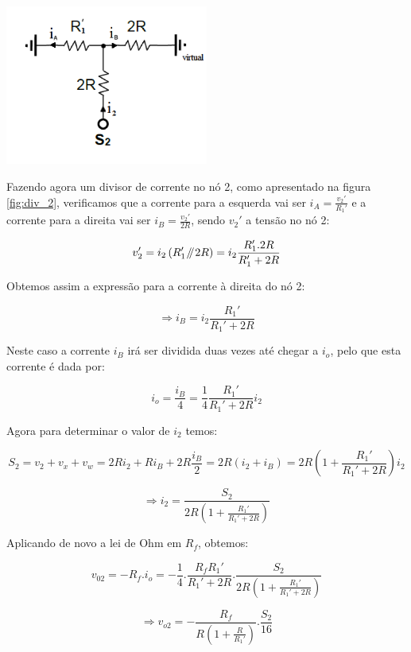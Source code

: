 \documentclass[a4paper,11pt]{report}
\newcommand{\parallelsum}{\mathbin{\!/\mkern-5mu/\!}} %
\begin{document}
\begin{center}
     \includegraphics[angle=0,width=0.5\textwidth]{div_2.png}
     \label{fig:div_2}
     \end{center}

Fazendo agora um divisor de corrente no nó 2, como apresentado na figura \ref{fig:div_2}, verificamos que a corrente para a esquerda vai ser $i_A=\frac{v_2'}{R_1'}$ e a corrente para a direita vai ser $i_B=\frac{v_2'}{2R}$, sendo $v_2'$ a tensão no nó 2:

$$v_2'=i_2\left(R_1'\parallelsum 2R\right)=i_2\frac{R_1'.2R}{R_1'+2R}$$

Obtemos assim a expressão para a corrente à direita do nó 2:

$$\Rightarrow i_B=i_2\frac{R_1'}{R_1'+2R}$$

Neste caso a corrente $i_B$ irá ser dividida duas vezes até chegar a $i_o$, pelo que esta corrente é dada por:

$$i_o=\frac{i_B}{4}=\frac{1}{4}\frac{R_1'}{R_1'+2R}i_2$$

Agora para determinar o valor de $i_2$ temos:

$$S_2=v_2+v_x+v_w=2Ri_2+Ri_B+2R\frac{i_B}{2}=2R\left(i_2+i_B\right)=2R\left(1+\frac{R_1'}{R_1'+2R}\right) i_2$$

$$\Rightarrow i_2=\frac{S_2}{2R\left(1+\frac{R_1'}{R_1'+2R}\right)}$$

Aplicando de novo a lei de Ohm em $R_f$, obtemos:

$$v_{02}=-R_f.i_o=-\frac{1}{4}.\frac{R_fR_1'}{R_1'+2R}.\frac{S_2}{2R\left(1+\frac{R_1'}{R_1'+2R}\right)}$$

\begin{equation}\label{eq:v02_1}
\Rightarrow v_{o2}=-\frac{R_f}{R\left(1+\frac{R}{R_1'}\right)}.\frac{S_2}{16}
\end{equation}\\
\end{document}
